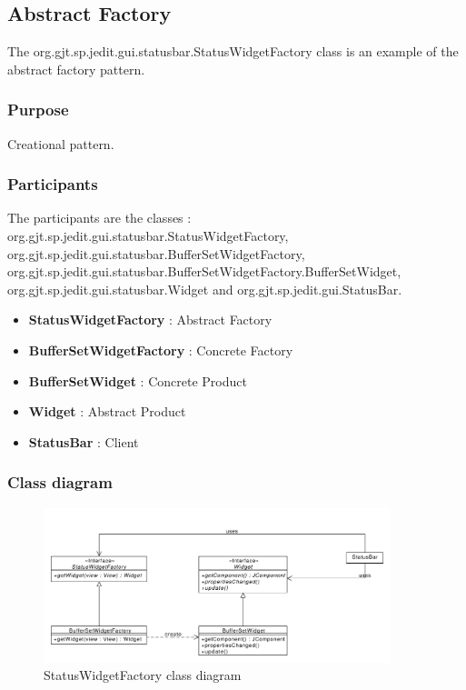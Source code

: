 \documentclass[a4paper,10pt]{article}
\begin{document}
\subsection{Abstract Factory}%
The org.gjt.sp.jedit.gui.statusbar.StatusWidgetFactory class is an example of the abstract factory pattern.

\subsubsection{Purpose}
Creational pattern.
\subsubsection{Participants}
The participants are the classes : org.gjt.sp.jedit.gui.statusbar.StatusWidgetFactory, org.gjt.sp.jedit.gui.statusbar.BufferSetWidgetFactory, org.gjt.sp.jedit.gui.statusbar.BufferSetWidgetFactory.BufferSetWidget, org.gjt.sp.jedit.gui.statusbar.Widget and org.gjt.sp.jedit.gui.StatusBar.

\begin{itemize}
 \item \textbf{StatusWidgetFactory} : Abstract Factory
 \item \textbf{BufferSetWidgetFactory} : Concrete Factory
 \item \textbf{BufferSetWidget} : Concrete Product
 \item \textbf{Widget} : Abstract Product
 \item \textbf{StatusBar} : Client
\end{itemize}

\subsubsection{Class diagram}
\begin{center}
\begin{figure}[h]
  \centerline{\includegraphics[width=0.9\textwidth]{abstractfactory-statuswidgetfactory-class-diagram.pdf}}
  \caption{StatusWidgetFactory class diagram}
\end{figure}
\end{center}
\end{document}
